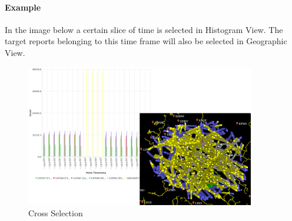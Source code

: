 \paragraph*{Example} In the image below a certain slice of time is selected in Histogram View. 
The target reports belonging to this time frame will also be selected in Geographic View.

\begin{figure}[H]
    \center
    \includegraphics[width=10cm]{figures/cross_selection.png}
  \caption{Cross Selection}
\end{figure}
